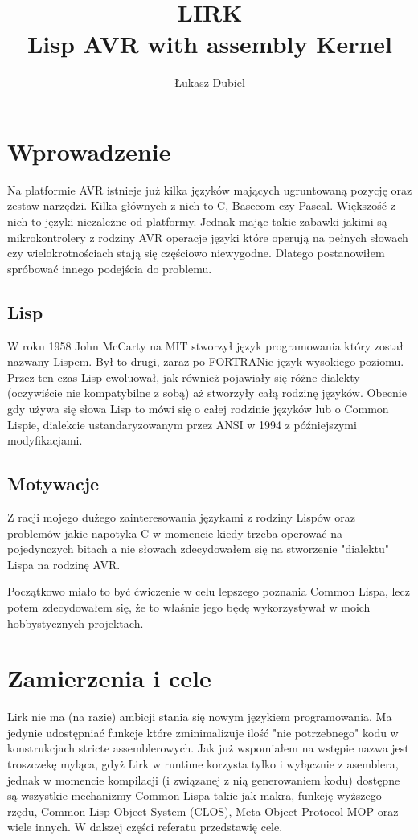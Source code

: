 \documentclass[11pt]{article}
\author{Łukasz Dubiel}
\title{LIRK \\ Lisp AVR with assembly Kernel}
\begin{document}
\maketitle

\section{Wprowadzenie}

Na platformie AVR istnieje już kilka języków mających ugruntowaną pozycję oraz zestaw narzędzi. Kilka głównych z nich to C, Basecom czy Pascal. Większość z nich to języki niezależne od platformy. Jednak mając takie zabawki jakimi są mikrokontrolery z rodziny AVR operacje języki które operują na pełnych słowach czy wielokrotnościach stają się częściowo niewygodne. Dlatego postanowiłem spróbować innego podejścia do problemu.

\subsection{Lisp}

W roku 1958 John McCarty na MIT stworzył język programowania który został nazwany Lispem. Był to drugi, zaraz po FORTRANie język wysokiego poziomu. Przez ten czas Lisp ewoluował, jak również pojawiały się różne dialekty (oczywiście nie kompatybilne z sobą) aż stworzyły całą rodzinę języków. Obecnie gdy używa się słowa Lisp to mówi się o całej rodzinie języków lub o Common Lispie, dialekcie ustandaryzowanym przez ANSI w 1994 z późniejszymi modyfikacjami.

\subsection{Motywacje}

Z racji mojego dużego zainteresowania językami z rodziny Lispów oraz problemów jakie napotyka C w momencie kiedy trzeba operować na pojedynczych bitach a nie słowach zdecydowałem się na stworzenie "dialektu" Lispa na rodzinę AVR. 

Początkowo miało to być ćwiczenie w celu lepszego poznania Common Lispa, lecz potem zdecydowałem się, że to właśnie jego będę wykorzystywał w moich hobbystycznych projektach.

\section{Zamierzenia i cele}
Lirk nie ma (na razie) ambicji stania się nowym językiem programowania. Ma jedynie udostępniać funkcje które zminimalizuje ilość "nie potrzebnego" kodu w konstrukcjach stricte assemblerowych. Jak już wspomiałem na wstępie nazwa jest troszczekę myląca, gdyż Lirk w runtime korzysta tylko i wyłącznie z asemblera, jednak w momencie kompilacji (i związanej z nią generowaniem kodu) dostępne są wszystkie mechanizmy Common Lispa takie jak makra, funkcję wyższego rzędu, Common Lisp Object System (CLOS), Meta Object Protocol  MOP oraz wiele innych.  W dalszej części referatu przedstawię cele.
\end{document}
